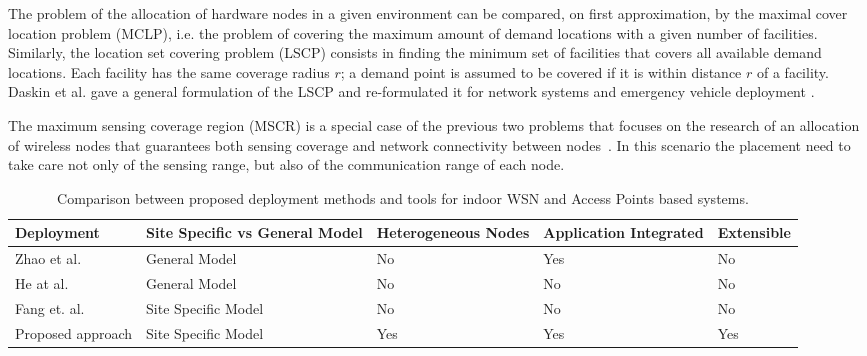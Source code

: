 The problem of the allocation of hardware nodes in a given environment can be compared, on first approximation, by the maximal cover location problem (MCLP), i.e. the problem of covering the maximum amount of demand locations with a given number of facilities. Similarly, the location set covering problem (LSCP) consists in finding the minimum set of facilities that covers all available demand locations. Each facility has the same coverage radius \(r\); a demand point is assumed to be covered if it is within distance \(r\) of a facility. Daskin et al. gave a general formulation of the LSCP \cite{Daskin1983} and re-formulated it for network systems and emergency vehicle deployment \cite{Daskin1981}.

The maximum sensing coverage region (MSCR) is a special case of the previous two problems that focuses on the research of an allocation of wireless nodes that guarantees both sensing coverage and network connectivity between nodes~\cite{VinhTranQuang, So2005}. In this scenario the placement need to take care not only of the sensing range, but also of the communication range of each node.

\begin{table}
\centering
\def\arraystretch{1}
\label{tab:comparison}
\caption{Comparison between proposed deployment methods and tools for indoor WSN and Access Points based systems.}
\begin{tabulary}{\textwidth}{| L | L | L | L | L |}
    \hline
    \textbf{Deployment} & \textbf{Site Specific vs General Model} & \textbf{Heterogeneous Nodes} & \textbf{Application Integrated} & \textbf{Extensible} \\ \hline
    Zhao et al. \cite{Zhao2008} & General Model & No & Yes & No\\ \hline
    He at al. \cite{He2011} & General Model & No & No & No\\ \hline
    Fang et. al. \cite{Fang2010} & Site Specific Model & No & No & No\\ \hline
    Proposed approach & Site Specific Model & Yes & Yes & Yes\\ \hline

    \end{tabulary}
\end{table}


